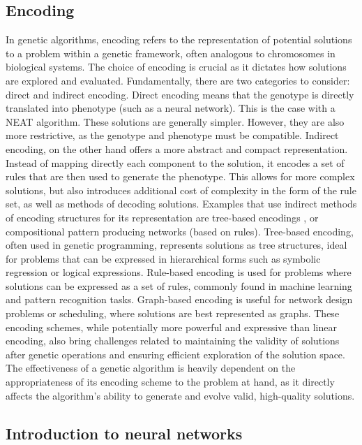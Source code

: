 \documentclass{article}
\begin{document}
\subsection{Encoding}
In genetic algorithms, encoding refers to the representation of potential solutions to a problem within a genetic framework, often analogous to chromosomes in biological systems.
The choice of encoding is crucial as it dictates how solutions are explored and evaluated.
Fundamentally, there are two categories to consider: direct and indirect encoding.
Direct encoding means that the genotype is directly translated into phenotype (such as a neural network). This is the case with a NEAT algorithm.
These solutions are generally simpler. However, they are also more restrictive, as the genotype and phenotype must be compatible.
Indirect encoding, on the other hand offers a more abstract and compact representation. Instead of mapping directly each component to the solution,
it encodes a set of rules that are then used to generate the phenotype. This allows for more complex solutions, but also introduces additional 
cost of complexity in the form of the rule set, as well as methods of decoding solutions.
Examples that use indirect methods of encoding structures for its representation are tree-based encodings \cite{encoding}, or compositional pattern producing networks (based on rules).\cite{HyperNeat} 
Tree-based encoding, often used in genetic programming, represents solutions as tree structures, 
ideal for problems that can be expressed in hierarchical forms such as symbolic regression or logical expressions.
Rule-based encoding is used for problems where solutions can be expressed as a set of rules,
commonly found in machine learning and pattern recognition tasks. Graph-based encoding is useful for network design problems or scheduling,
where solutions are best represented as graphs. These encoding schemes, while potentially more powerful and expressive than linear encoding,
also bring challenges related to maintaining the validity of solutions after genetic operations and ensuring efficient exploration of the solution space.
The effectiveness of a genetic algorithm is heavily dependent on the appropriateness of its encoding scheme to the problem at hand, as it directly affects the algorithm's ability to generate and evolve valid, high-quality solutions.

\subsection{Introduction to neural networks}
\end{document}
